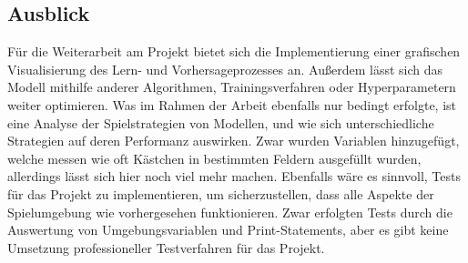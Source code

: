 \newpage
\subsection{Ausblick}
Für die Weiterarbeit am Projekt bietet sich die Implementierung einer grafischen Visualisierung des Lern- und Vorhersageprozesses an. Außerdem lässt sich das Modell mithilfe anderer Algorithmen, Trainingsverfahren oder Hyperparametern weiter optimieren. Was im Rahmen der Arbeit ebenfalls nur bedingt erfolgte, ist eine Analyse der Spielstrategien von Modellen, und wie sich unterschiedliche Strategien auf deren Performanz auswirken. Zwar wurden Variablen hinzugefügt, welche messen wie oft Kästchen in bestimmten Feldern ausgefüllt wurden, allerdings lässt sich hier noch viel mehr machen. Ebenfalls wäre es sinnvoll, Tests für das Projekt zu implementieren, um sicherzustellen, dass alle Aspekte der Spielumgebung wie vorhergesehen funktionieren. Zwar erfolgten Tests durch die Auswertung von Umgebungsvariablen und Print-Statements, aber es gibt keine Umsetzung professioneller Testverfahren für das Projekt.